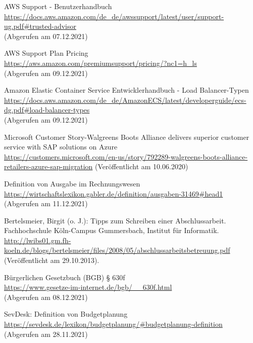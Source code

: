 \begin{thebibliography}{HR08}

    AWS Support - Benutzerhandbuch\\
  \url{https://docs.aws.amazon.com/de_de/awssupport/latest/user/support-ug.pdf#trusted-advisor}\\
  (Abgerufen am 07.12.2021)

   AWS Support Plan Pricing\\
  \url{https://aws.amazon.com/premiumsupport/pricing/?nc1=h_ls}\\
  (Abgerufen am 09.12.2021)

    Amazon Elastic Container Service Entwicklerhandbuch - Load Balancer-Typen\\
  \url{https://docs.aws.amazon.com/de_de/AmazonECS/latest/developerguide/ecs-dg.pdf#load-balancer-types}\\
  (Abgerufen am 09.12.2021)

   Microsoft Customer Story-Walgreens Boots Alliance delivers superior customer service with SAP solutions on Azure \\
  \url{https://customers.microsoft.com/en-us/story/792289-walgreens-boots-alliance-retailers-azure-sap-migration}
  (Veröffentlicht am 10.06.2020)
 
   Definition von Ausgabe im Rechnungswesen\\
  \url{https://wirtschaftslexikon.gabler.de/definition/ausgaben-31469#head1}
  (Abgerufen am 11.12.2021)

  Bertelsmeier, Birgit (o. J.): Tipps zum Schrei\-b\-en ei\-n\-er Ab\-sch\-luss\-ar\-beit. Fach\-hoch\-schu\-le Köln-Campus Gummersbach, Institut für Informatik. \\
  \url{http://lwibs01.gm.fh-koeln.de/blogs/bertelsmeier/files/2008/05/abschlussarbeitsbetreuung.pdf} (Veröffentlicht am 29.10.2013).

   Bürgerlichen Gesetzbuch (BGB) § 630f\\
  \url{https://www.gesetze-im-internet.de/bgb/__630f.html}\\
  (Abgerufen am 08.12.2021)

  SevDesk: Definition von Budgetplanung\\
  \url{https://sevdesk.de/lexikon/budgetplanung/#budgetplanung-definition}\\
  (Abgerufen am 28.11.2021)


\end{thebibliography}
